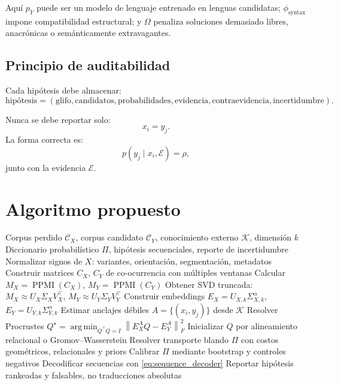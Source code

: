 \documentclass[11pt,a4paper]{article}
\DeclareMathOperator*{\argmin}{arg\,min}
\newcommand{\1}{\mathbf{1}}
\newcommand{\norm}[1]{\left\lVert #1 \right\rVert}
\numberwithin{equation}{section}
\begin{document}
Aquí \(p_Y\) puede ser un modelo de lenguaje entrenado en lenguas candidatas; \(\phi_{\mathrm{syntax}}\) impone compatibilidad estructural; y \(\Omega\) penaliza soluciones demasiado libres, anacrónicas o semánticamente extravagantes.

\subsection{Principio de auditabilidad}

Cada hipótesis debe almacenar:
\[
    \text{hipótesis}
    =
    (\text{glifo},\text{candidatos},\text{probabilidades},\text{evidencia},\text{contraevidencia},\text{incertidumbre}).
\]

Nunca se debe reportar solo:
\[
    x_i = y_j.
\]
La forma correcta es:
\[
    p(y_j\mid x_i,\mathcal{E})=\rho,
\]
junto con la evidencia \(\mathcal{E}\).

\section{Algoritmo propuesto}

\begin{algorithm}[H]
\caption{Spectral Submersion Decipherment}
\begin{algorithmic}[1]
\Require Corpus perdido \(\mathcal{C}_X\), corpus candidato \(\mathcal{C}_Y\), conocimiento externo \(\mathcal{K}\), dimensión \(k\)
\Ensure Diccionario probabilístico \(\Pi\), hipótesis secuenciales, reporte de incertidumbre
\State Normalizar signos de \(X\): variantes, orientación, segmentación, metadatos
\State Construir matrices \(C_X\), \(C_Y\) de co-ocurrencia con múltiples ventanas
\State Calcular \(M_X=\operatorname{PPMI}(C_X)\), \(M_Y=\operatorname{PPMI}(C_Y)\)
\State Obtener SVD truncada: \(M_X\approx U_X\Sigma_XV_X^\top\), \(M_Y\approx U_Y\Sigma_YV_Y^\top\)
\State Construir embeddings \(E_X=U_{X,k}\Sigma_{X,k}^{\alpha}\), \(E_Y=U_{Y,k}\Sigma_{Y,k}^{\alpha}\)
\State Estimar anclajes débiles \(A=\{(x_i,y_j)\}\) desde \(\mathcal{K}\)
    \State Resolver Procrustes \(Q^\star=\argmin_{Q^\top Q=I}\norm{E_X^AQ-E_Y^A}_F^2\)
\Else
    \State Inicializar \(Q\) por alineamiento relacional o Gromov--Wasserstein
\EndIf
\State Resolver transporte blando \(\Pi\) con costos geométricos, relacionales y priors
\State Calibrar \(\Pi\) mediante bootstrap y controles negativos
\State Decodificar secuencias con \eqref{eq:sequence_decoder}
\State Reportar hipótesis rankeadas y falsables, no traducciones absolutas
\end{algorithmic}
\end{algorithm}
\end{document}
